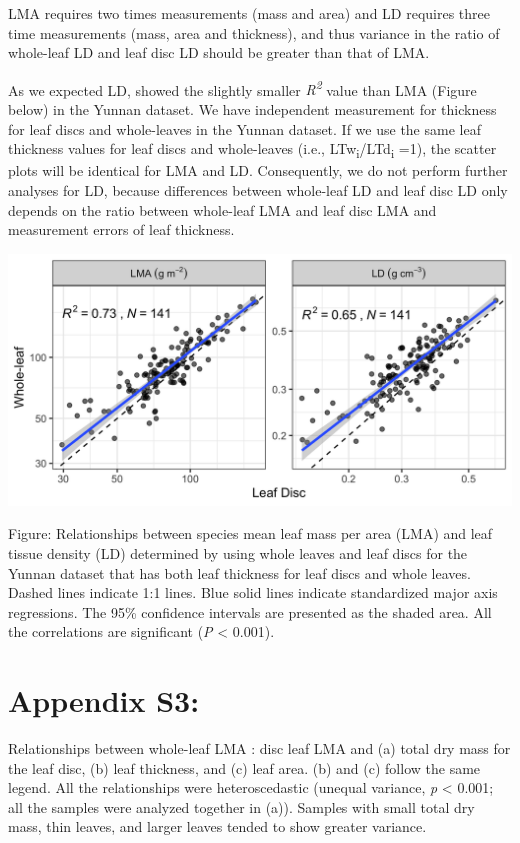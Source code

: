 \documentclass[
  12pt,
  a4paper,
,tablecaptionabove
]{scrartcl}
\begin{document}
LMA requires two times measurements (mass and area) and LD requires
three time measurements (mass, area and thickness), and thus variance in
the ratio of whole-leaf LD and leaf disc LD should be greater than that
of LMA.

As we expected LD, showed the slightly smaller
\emph{R\textsuperscript{2}} value than LMA (Figure below) in the Yunnan
dataset. We have independent measurement for thickness for leaf discs
and whole-leaves in the Yunnan dataset. If we use the same leaf
thickness values for leaf discs and whole-leaves (i.e.,
LTw\textsubscript{i}/LTd\textsubscript{i} =1), the scatter plots will be
identical for LMA and LD. Consequently, we do not perform further
analyses for LD, because differences between whole-leaf LD and leaf disc
LD only depends on the ratio between whole-leaf LMA and leaf disc LMA
and measurement errors of leaf thickness.

\includegraphics[width=6.25in,height=\textheight]{../figs/fig1.png}

Figure: Relationships between species mean leaf mass per area (LMA) and
leaf tissue density (LD) determined by using whole leaves and leaf discs
for the Yunnan dataset that has both leaf thickness for leaf discs and
whole leaves. Dashed lines indicate 1:1 lines. Blue solid lines indicate
standardized major axis regressions. The 95\% confidence intervals are
presented as the shaded area. All the correlations are significant
(\emph{P} \textless{} 0.001).

\newpage

\hypertarget{appendix-s3}{%
\section{Appendix S3:}\label{appendix-s3}}

Relationships between whole-leaf LMA : disc leaf LMA and (a) total dry
mass for the leaf disc, (b) leaf thickness, and (c) leaf area. (b) and
(c) follow the same legend. All the relationships were heteroscedastic
(unequal variance, \emph{p} \textless{} 0.001; all the samples were
analyzed together in (a)). Samples with small total dry mass, thin
leaves, and larger leaves tended to show greater variance.
\end{document}
